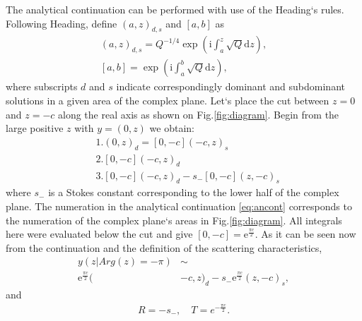 \documentclass[aip,jmp,reprint]{revtex4-1}
\def\rmi{\mathrm{i}}
\def\rme{\mathrm{e}}
\def\rmd{\mathrm{d}}
\begin{document}
The analytical continuation can be performed with use of the Heading`s rules. 
Following Heading\cite{heading}, define $(a,z)_{d,s}$ and $[a,b]$ as
\begin{eqnarray}
(a,z)_{d,s} = Q^{-1/4}\exp \left( \rmi \int_a^z \sqrt{Q} \rmd z \right),
\\
\left[a,b\right] = \exp \left( \rmi \int_a^b \sqrt{Q} \rmd z \right), 
\end{eqnarray}
where subscripts $d$ and $s$ indicate correspondingly dominant and subdominant solutions 
in a given area of the complex plane. Let`s place the cut between $z=0$ and $z=-c$ 
along the real axis as shown on Fig.\ref{fig:diagram}. Begin from the large positive $z$ 
with $y=(0,z)$ we obtain:
\begin{equation}
\begin{split} 
&1.(0,z)_d=[0,-c](-c,z)_s 
\\
&2.[0,-c](-c,z)_d 
\\
&3.[0,-c](-c,z)_d - s_-[0,-c](z,-c)_s
\label{eq:ancont}
\end{split}
\end{equation}
where $s_-$ is a Stokes constant corresponding to the lower half of the complex plane.
The numeration in the analytical continuation \eqref{eq:ancont} corresponds to the
numeration of the complex plane`s areas in Fig.\ref{fig:diagram}.
All integrals here were evaluated below the cut and give $[0,-c]=\rme^{\frac{\pi c}{2}}$. As it
can be seen now from the continuation and the definition of the scattering characteristics,
\begin{equation}
\begin{split}
y(z | Arg(z) = -\pi) &\sim 
\\
\rme^{\frac{\pi c}{2}}(&-c,z)_d - s_-\rme^{\frac{\pi c}{2}}(z,-c)_s,
\end{split}
\end{equation}
and
\begin{eqnarray}
R = -s_-, \quad T = e^{-\frac{\pi c}{2}}.
\label{eq:scattr}
\end{eqnarray}
\end{document}
